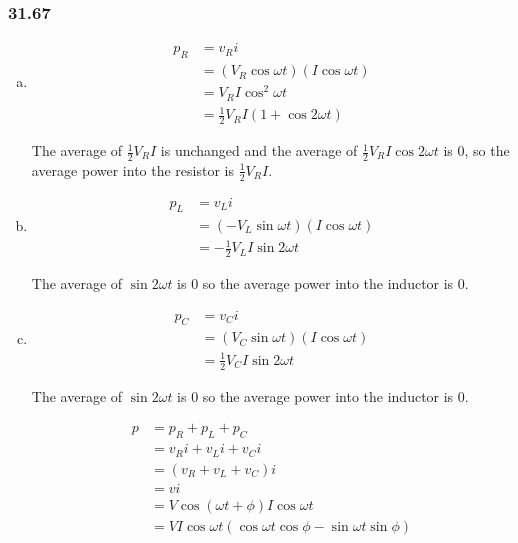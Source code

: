 \documentclass{article}
\begin{document}
\subsubsection{31.67}

\begin{enumerate}[(a)]
  \item

        \begin{align*}
          p_R & = v_R i                                   \\
              & = (V_R \cos \omega t) (I \cos \omega t)   \\
              & = V_R I \cos^2 \omega t                   \\
              & = \frac{1}{2} V_R I (1 + \cos 2 \omega t)
        \end{align*}

        The average of $\frac{1}{2} V_R I$ is unchanged and the average of $\frac{1}{2} V_R I \cos 2 \omega t$ is $0$, so the average power into the resistor is $\frac{1}{2} V_R I$.

  \item

        \begin{align*}
          p_L & = v_L i                                 \\
              & = (-V_L \sin \omega t)(I \cos \omega t) \\
              & = -\frac{1}{2} V_L I \sin 2 \omega t
        \end{align*}

        The average of $\sin 2 \omega t$ is $0$ so the average power into the inductor is $0$.

  \item

        \begin{align*}
          p_C & = v_C i                                \\
              & = (V_C \sin \omega t)(I \cos \omega t) \\
              & = \frac{1}{2} V_C I \sin 2 \omega t
        \end{align*}

        The average of $\sin 2 \omega t$ is $0$ so the average power into the inductor is $0$.

        \begin{align*}
          p & = p_R + p_L + p_C                                                       \\
            & = v_R i + v_L i + v_C i                                                 \\
            & = (v_R + v_L + v_C) i                                                   \\
            & = v i                                                                   \\
            & = V \cos (\omega t + \phi) I \cos \omega t                              \\
            & = V I \cos \omega t (\cos \omega t \cos \phi - \sin \omega t \sin \phi)
        \end{align*}
\end{enumerate}
\end{document}
